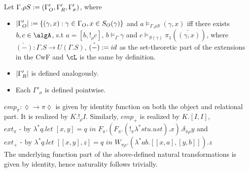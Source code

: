\documentclass[12pt,a4paper]{article}
\renewcommand{\O}{_{O}}
\newcommand{\R}{\ensuremath{_{R}}}
\begin{document}
Let $\Gamma . \rho S \define (\Gamma'\O, \Gamma'\R, \Gamma'_\sigma)$, where
\begin{itemize}
  \item $\carr{\Gamma'\O} \define \{(\gamma, x) : \gamma \in \Gamma\O, x \in S\O(\gamma) \}$ and $ a \vDash_{\Gamma. \rho S} (\gamma, x)$ iff there exists $b, c \in \algA$, s.t $a = [b, !_\rho c]$, $b \vDash_{\Gamma} \gamma$ and $c \vDash_{S(\gamma)} \pi_1(\check{(\gamma, x)}) $, where $\check{(-)} : \Gamma . S \to U(\Gamma . S)$, $\check{(-)} := id$ as the set-theoretic part of the extensions in the CwF and $\cL$ is the same by definition.
  
  \item $\carr{\Gamma'\R}$ is defined analogously. 
  
  \item Each $\Gamma'_\sigma$ is defined pointwise.
\end{itemize}
            
$emp_\pi : \lozenge \to \pi \lozenge$ is given by identity function on both the object and relational part. It is realized by $K. !_\rho I$. Similarly, $emp_+$ is realized by $K . [I, I]$,\\
$ext_\pi$ - by $\lambda^* q. \textit{let }[x, y] = q\textit{ in } F_\pi . (F_\pi. (!_\pi \lambda^* s t u. u s t) . x) . \delta_{\pi \rho} y$ and \\
$ext_+$ - by $\lambda^* q. \textit{let } [[x , y], z] = q \textit{ in } W_{\pi\rho}.(\lambda^* a b. [[x, a],  [y, b]]).z$\\

The underlying function part of the above-defined natural transformations is given by identity, hence naturality follows trivially.

%
%
%
\end{document}
